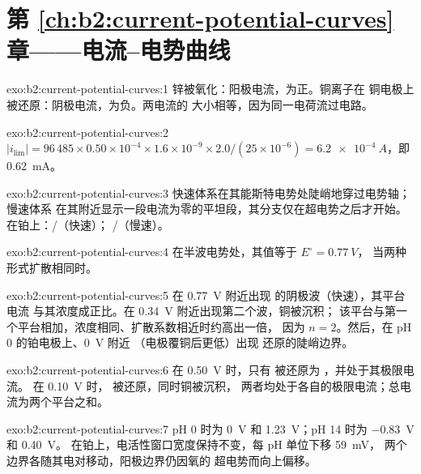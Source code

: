 \section*{第 \ref{ch:b2:current-potential-curves} 章——电流–电势曲线}

\begin{solution}{exo:b2:current-potential-curves:1}
锌被氧化：阳极电流，为正。铜离子在
铜电极上被还原：阴极电流，为负。两电流的
大小相等，因为同一电荷流过电路。
\end{solution}

\begin{solution}{exo:b2:current-potential-curves:2}
$|i_{\lim}| = 96\,485 \times 0.50 \times 10^{-4} \times 1.6 \times 10^{-9} \times
2.0/(25 \times 10^{-6}) = \qty{6.2e-4}{A}$，即 \qty{0.62}{mA}。
\end{solution}

\begin{solution}{exo:b2:current-potential-curves:3}
快速体系在其能斯特电势处陡峭地穿过电势轴；慢速体系
在其附近显示一段电流为零的平坦段，其分支仅在超电势之后才开始。
在铂上：/（快速）；
/（慢速）。
\end{solution}

\begin{solution}{exo:b2:current-potential-curves:4}
在半波电势处，其值等于 $E^\circ = \qty{0.77}{V}$，
当两种形式扩散相同时。
\end{solution}

\begin{solution}{exo:b2:current-potential-curves:5}
在 \qty{0.77}{V} 附近出现  的阴极波（快速），其平台电流
与其浓度成正比。在 \qty{0.34}{V} 附近出现第二个波，铜被沉积；
该平台与第一个平台相加，浓度相同、扩散系数相近时约高出一倍，
因为 $n = 2$。然后，在 pH 0 的铂电极上、\qty{0}{V} 附近
（电极覆铜后更低）出现
 还原的陡峭边界。
\end{solution}

\begin{solution}{exo:b2:current-potential-curves:6}
在 \qty{0.50}{V} 时，只有  被还原为 ，并处于其极限电流。
在 \qty{0.10}{V} 时， 被还原，同时铜被沉积，
两者均处于各自的极限电流；总电流为两个平台之和。
\end{solution}

\begin{solution}{exo:b2:current-potential-curves:7}
pH 0 时为 \qty{0}{V} 和 \qty{1.23}{V}；pH 14 时为 \qty{-0.83}{V} 和 \qty{0.40}{V}。
在铂上，电活性窗口宽度保持不变，每 pH 单位下移 \qty{59}{mV}，
两个边界各随其电对移动，阳极边界仍因氧的
超电势而向上偏移。
\end{solution}

